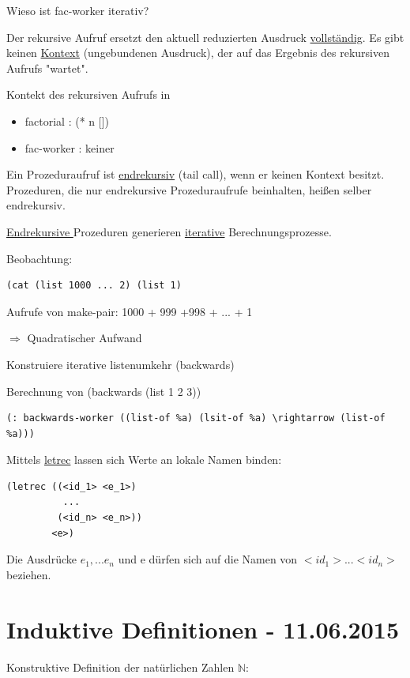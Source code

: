 \documentclass[a4paper, 20pt, openany]{book}
\begin{document}
Wieso ist fac-worker iterativ?

Der rekursive Aufruf ersetzt den aktuell reduzierten Ausdruck \underline{vollständig}. Es gibt keinen \underline{Kontext} (ungebundenen Ausdruck), der auf das Ergebnis des rekursiven Aufrufs "wartet".

Kontekt des rekursiven Aufrufs in

\begin{itemize}
  \item factorial : (* n [])
  \item fac-worker : keiner
\end{itemize}

Ein Prozeduraufruf ist \underline{endrekursiv} (tail call), wenn er keinen Kontext besitzt. Prozeduren, die nur endrekursive Prozeduraufrufe beinhalten, heißen selber endrekursiv.

\underline{Endrekursive }Prozeduren generieren \underline{iterative} Berechnungsprozesse.

Beobachtung:

\begin{lstlisting}
(cat (list 1000 ... 2) (list 1)
\end{lstlisting}

Aufrufe von make-pair: 1000 + 999 +998 + ... + 1

$\Rightarrow$ Quadratischer Aufwand

Konstruiere iterative listenumkehr (backwards)

Berechnung von (backwards (list 1 2 3))

\begin{lstlisting}
(: backwards-worker ((list-of %a) (lsit-of %a) \rightarrow (list-of %a)))
\end{lstlisting}

Mittels \underline{letrec} lassen sich Werte an lokale Namen binden:

\begin{lstlisting}
(letrec ((<id_1> <e_1>)
          ...
         (<id_n> <e_n>))
        <e>)
\end{lstlisting}

Die Ausdrücke $e_1, ... e_n$ und e dürfen sich auf die Namen von $<id_1>...<id_n>$ beziehen.


\chapter{Induktive Definitionen - 11.06.2015}

Konstruktive Definition der natürlichen Zahlen $\mathbb{N}$:
\end{document}

